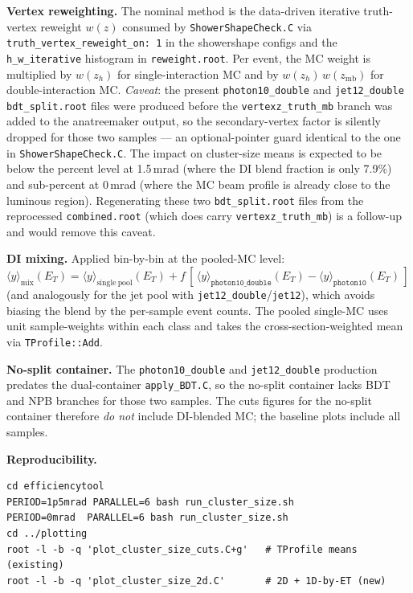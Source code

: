 \documentclass[11pt,a4paper]{article}
\begin{document}
\textbf{Vertex reweighting.}  The nominal method is the data-driven
iterative truth-vertex reweight $w(z)$ consumed by
\texttt{ShowerShapeCheck.C} via \texttt{truth\_vertex\_reweight\_on:
1} in the showershape configs and the \texttt{h\_w\_iterative}
histogram in \texttt{reweight.root}.  Per event, the MC weight is
multiplied by $w(z_h)$ for single-interaction MC and by
$w(z_h)\,w(z_\mathrm{mb})$ for double-interaction MC.  \textit{Caveat}:
the present \texttt{photon10\_double} and \texttt{jet12\_double}
\texttt{bdt\_split.root} files were produced before the
\texttt{vertexz\_truth\_mb} branch was added to the anatreemaker
output, so the secondary-vertex factor is silently dropped for those
two samples --- an optional-pointer guard identical to the one in
\texttt{ShowerShapeCheck.C}.  The impact on cluster-size means is
expected to be below the percent level at 1.5\,mrad (where the DI
blend fraction is only 7.9\%) and sub-percent at 0\,mrad (where the
MC beam profile is already close to the luminous region). Regenerating
these two \texttt{bdt\_split.root} files from the reprocessed
\texttt{combined.root} (which does carry \texttt{vertexz\_truth\_mb})
is a follow-up and would remove this caveat.

\textbf{DI mixing.}  Applied bin-by-bin at the pooled-MC level:
$\langle y\rangle_{\mathrm{mix}}(E_T) = \langle
y\rangle_{\mathrm{single\ pool}}(E_T) + f\,
[\,\langle y\rangle_{\texttt{photon10\_double}}(E_T) -
  \langle y\rangle_{\texttt{photon10}}(E_T)\,]$
(and analogously for the jet pool with
\texttt{jet12\_double}/\texttt{jet12}), which avoids biasing the blend
by the per-sample event counts.  The pooled single-MC uses unit
sample-weights within each class and takes the cross-section-weighted
mean via \texttt{TProfile::Add}.

\textbf{No-split container.}  The \texttt{photon10\_double} and
\texttt{jet12\_double} production predates the dual-container
\texttt{apply\_BDT.C}, so the no-split container lacks BDT and NPB
branches for those two samples.  The cuts figures for the no-split
container therefore \emph{do not} include DI-blended MC; the baseline
plots include all samples.

\textbf{Reproducibility.}
\begin{verbatim}
cd efficiencytool
PERIOD=1p5mrad PARALLEL=6 bash run_cluster_size.sh
PERIOD=0mrad  PARALLEL=6 bash run_cluster_size.sh
cd ../plotting
root -l -b -q 'plot_cluster_size_cuts.C+g'   # TProfile means (existing)
root -l -b -q 'plot_cluster_size_2d.C'       # 2D + 1D-by-ET (new)
\end{verbatim}
\end{document}
